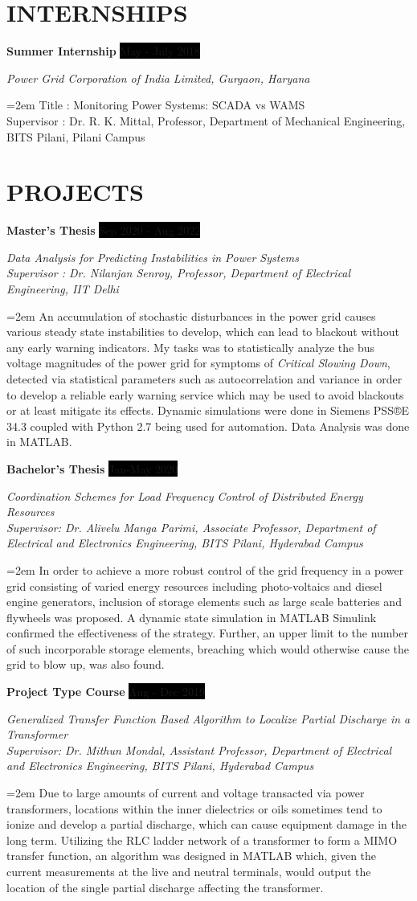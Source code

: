 \documentclass[paper=a4,fontsize=11pt]{scrartcl} %
\newcommand{\sepspace}{\vspace*{1em}}		%
\newcommand{\NewPart}[1]{\section*{\uppercase{#1}}}
\newcommand{\EducationEntry}[4]{
		\noindent \textbf{#1} \hfill      %
		\colorbox{Black}{%
			\parbox{6em}{%
			\hfill\color{White}#2}} \par  %
		\noindent \textit{#3} \par        %
		\noindent\hangindent=2em\hangafter=0 \small #4 %
		\normalsize \par}
\newcommand{\WorkEntry}[4]{				  %
		\noindent \textbf{#1} \hfill      %
		\colorbox{Black}{\color{White}#2} \par  %
		\noindent \textit{#3} \par              %
		\noindent\hangindent=2em\hangafter=0 \small #4 %
		\normalsize \par}
\begin{document}
\NewPart{Internships}{}

\WorkEntry{Summer Internship}{May - July 2018}{Power Grid Corporation of India Limited, Gurgaon, Haryana}{Title : Monitoring Power Systems: SCADA vs WAMS\\Supervisor : Dr. R. K. Mittal, Professor, Department of Mechanical Engineering, BITS Pilani, Pilani Campus}

\NewPart{Projects}{}

\WorkEntry{Master's Thesis}{Sep 2020 - Aug 2022}{Data Analysis for Predicting Instabilities in Power Systems\\ Supervisor : Dr. Nilanjan Senroy, Professor, Department of Electrical Engineering, IIT Delhi}{An accumulation of stochastic disturbances in the power grid causes various steady state instabilities to develop, which can lead to blackout without any early warning indicators. My tasks was to statistically analyze the bus voltage magnitudes of the power grid for symptoms of \textit{Critical Slowing Down}, detected via statistical parameters such as autocorrelation and variance in order to develop a reliable early warning service which may be used to avoid blackouts or at least mitigate its effects. Dynamic simulations were done in Siemens PSS®E 34.3 coupled with Python 2.7 being used for automation. Data Analysis was done in MATLAB.}
\sepspace


\WorkEntry{Bachelor's Thesis}{Jan-May 2020}{Coordination Schemes for Load Frequency Control of Distributed Energy Resources\\ Supervisor: Dr. Alivelu Manga Parimi, Associate Professor, Department of Electrical and Electronics Engineering, BITS Pilani, Hyderabad Campus}{In order to achieve a more robust control of the grid frequency in a power grid consisting of varied energy resources including photo-voltaics and diesel engine generators, inclusion of storage elements such as large scale batteries and flywheels was proposed. A dynamic state simulation in MATLAB Simulink confirmed the effectiveness of the strategy. Further, an upper limit to the number of such incorporable storage elements, breaching which would otherwise cause the grid to blow up, was also found.}
\sepspace

\WorkEntry{Project Type Course}{Aug - Dec 2019}{Generalized Transfer Function Based Algorithm to Localize Partial Discharge in a Transformer \\ Supervisor: Dr. Mithun Mondal, Assistant Professor, Department of Electrical and Electronics Engineering, BITS Pilani, Hyderabad Campus}{Due to large amounts of current and voltage transacted via power transformers, locations within the inner dielectrics or oils sometimes tend to ionize and develop a partial discharge, which can cause equipment damage in the long term. Utilizing the RLC ladder network of a transformer to form a MIMO transfer function, an algorithm was designed in MATLAB which, given the current measurements at the live and neutral terminals, would output the location of the single partial discharge affecting the transformer.}
\end{document}
